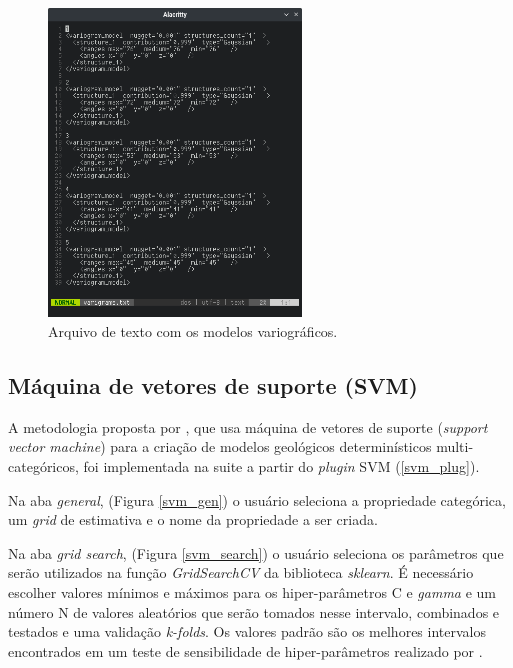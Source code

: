 \begin{figure}[H]
	\caption{\label{vario_model_txt}Arquivo de texto com os modelos variográficos.}
	\centering
		\includegraphics[width=0.6\textwidth]{apendice/imagens/variograms.png}
\end{figure}

\subsection{Máquina de vetores de suporte (SVM)}

A metodologia proposta por , que usa máquina de vetores de suporte (\textit{support vector machine}) para a criação de modelos geológicos determinísticos multi-categóricos, foi implementada na suite a partir do \textit{plugin} SVM (\autoref{svm_plug}).

Na aba \textit{general}, (Figura \autoref{svm_gen}) o usuário seleciona a propriedade categórica, um \textit{grid} de estimativa e o nome da propriedade a ser criada.

Na aba \textit{grid search}, (Figura \autoref{svm_search}) o usuário seleciona os parâmetros que serão utilizados na função \textit{GridSearchCV} da biblioteca \textit{sklearn}. É necessário escolher valores mínimos e máximos para os hiper-parâmetros C e \textit{gamma} e um número N de valores aleatórios que serão tomados nesse intervalo, combinados e testados e uma validação \textit{k-folds}. Os valores padrão são os melhores intervalos encontrados em um teste de sensibilidade de hiper-parâmetros realizado por .

